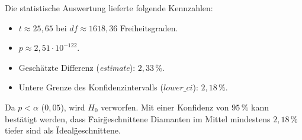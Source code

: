 Die statistische Auswertung lieferte folgende Kennzahlen:
\begin{itemize}
    \item $t \approx 25,65$ bei $df \approx 1618,36$ Freiheitsgraden.
    \item $p \approx 2,51 \cdot 10^{-122}$.
    \item Geschätzte Differenz (\textit{estimate}): $2,33\,\%$.
    \item Untere Grenze des Konfidenzintervalls ($lower\_ci$): $2,18\,\%$.
\end{itemize}

Da $p < \alpha$ ($0,05$), wird $H_0$ verworfen. Mit einer Konfidenz von $95\,\%$ kann bestätigt werden, dass \"Fair\" geschnittene Diamanten im Mittel mindestens $2,18\,\%$ tiefer sind als \"Ideal\" geschnittene.
